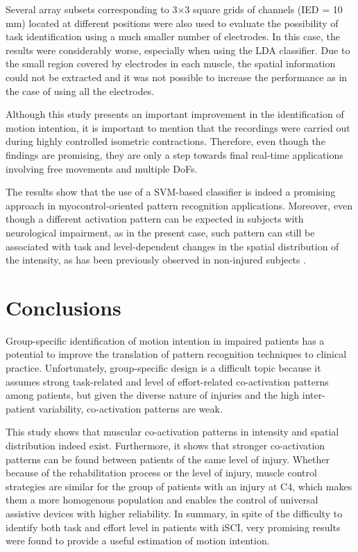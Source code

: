 Several array subsets corresponding to 3$\times$3 square grids of channels (IED = 10 mm) located at different positions were also used to evaluate the possibility of task identification using a much smaller number of electrodes. In this case, the results were considerably worse, especially when using the LDA classifier. Due to the small region covered by electrodes in each muscle, the spatial information could not be extracted and it was not possible to increase the performance as in the case of using all the electrodes.

Although this study presents an important improvement in the identification of motion intention, it is important to mention that the recordings were carried out during highly controlled isometric contractions. Therefore, even though the findings are promising, they are only a step towards final real-time applications involving free movements and multiple DoFs.

The results show that the use of a SVM-based classifier is indeed a promising approach in myocontrol-oriented pattern recognition applications. Moreover, even though a different activation pattern can be expected in subjects with neurological impairment, as in the present case, such pattern can still be associated with task and level-dependent changes in the spatial distribution of the intensity, as has been previously observed in non-injured subjects \citep{Rojas-Martinez2012}.


\section{Conclusions}
Group-specific identification of motion intention in impaired patients has a potential to improve the translation of pattern recognition techniques to clinical practice. Unfortunately, group-specific design is a difficult topic because it assumes strong task-related and level of effort-related co-activation patterns among patients, but given the diverse nature of injuries and the high inter-patient variability, co-activation patterns are weak.

This study shows that muscular co-activation patterns in intensity and spatial distribution indeed exist. Furthermore, it shows that stronger co-activation patterns can be found between patients of the same level of injury. Whether because of the rehabilitation process or the level of injury, muscle control strategies are similar for the group of patients with an injury at C4, which makes them a more homogenous population and enables the control of universal assistive devices with higher reliability. In summary, in spite of the difficulty to identify both task and effort level in patients with iSCI, very promising results were found to provide a useful estimation of motion intention. 


